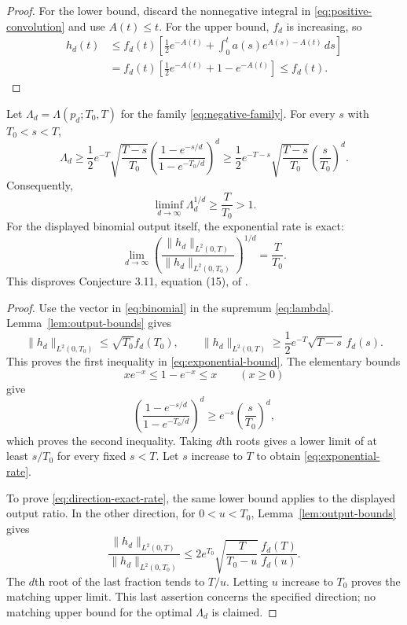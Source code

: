 \begin{proof}
For the lower bound, discard the nonnegative integral in \eqref{eq:positive-convolution} and use $A(t)\leq t$. For the upper bound, $f_d$ is increasing, so
\begin{align*}
 h_d(t)
 &\leq f_d(t)\left[
  \frac12e^{-A(t)}+
  \int_0^ta(s)e^{A(s)-A(t)}\,ds\right]\\
 &=f_d(t)\left[\frac12e^{-A(t)}+1-e^{-A(t)}\right]
 \leq f_d(t).
\end{align*}
\end{proof}

\begin{theorem}
\label{thm:exponential}
Let $\Lambda_d=\Lambda(p_d;T_0,T)$ for the family \eqref{eq:negative-family}. For every $s$ with $T_0<s<T$,
\begin{equation}
 \Lambda_d\geq
 \frac12e^{-T}\sqrt{\frac{T-s}{T_0}}
 \left(\frac{1-e^{-s/d}}{1-e^{-T_0/d}}\right)^d
 \geq
 \frac12e^{-T-s}\sqrt{\frac{T-s}{T_0}}
 \left(\frac{s}{T_0}\right)^d.
 \label{eq:exponential-bound}
\end{equation}
Consequently,
\begin{equation}
 \liminf_{d\to\infty}\Lambda_d^{1/d}\geq\frac{T}{T_0}>1.
 \label{eq:exponential-rate}
\end{equation}
For the displayed binomial output itself, the exponential rate is exact:
\begin{equation}
 \lim_{d\to\infty}
 \left(\frac{\|h_d\|_{L^2(0,T)}}{\|h_d\|_{L^2(0,T_0)}}\right)^{1/d}
 =\frac{T}{T_0}.
 \label{eq:direction-exact-rate}
\end{equation}
This disproves Conjecture 3.11, equation (15), of \cite{KH2026}.
\end{theorem}

\begin{proof}
Use the vector in \eqref{eq:binomial} in the supremum \eqref{eq:lambda}. Lemma~\ref{lem:output-bounds} gives
\[
 \|h_d\|_{L^2(0,T_0)}\leq\sqrt{T_0}f_d(T_0),\qquad
 \|h_d\|_{L^2(0,T)}\geq
 \frac12e^{-T}\sqrt{T-s}\,f_d(s).
\]
This proves the first inequality in \eqref{eq:exponential-bound}. The elementary bounds
\[
 xe^{-x}\leq1-e^{-x}\leq x\qquad(x\geq0)
\]
give
\[
 \left(\frac{1-e^{-s/d}}{1-e^{-T_0/d}}\right)^d
 \geq e^{-s}\left(\frac{s}{T_0}\right)^d,
\]
which proves the second inequality. Taking $d$th roots gives a lower limit of at least $s/T_0$ for every fixed $s<T$. Let $s$ increase to $T$ to obtain \eqref{eq:exponential-rate}.

To prove \eqref{eq:direction-exact-rate}, the same lower bound applies to the displayed output ratio. In the other direction, for $0<u<T_0$, Lemma~\ref{lem:output-bounds} gives
\[
 \frac{\|h_d\|_{L^2(0,T)}}{\|h_d\|_{L^2(0,T_0)}}
 \leq2e^{T_0}\sqrt{\frac{T}{T_0-u}}\,\frac{f_d(T)}{f_d(u)}.
\]
The $d$th root of the last fraction tends to $T/u$. Letting $u$ increase to $T_0$ proves the matching upper limit. This last assertion concerns the specified direction; no matching upper bound for the optimal $\Lambda_d$ is claimed.
\end{proof}

